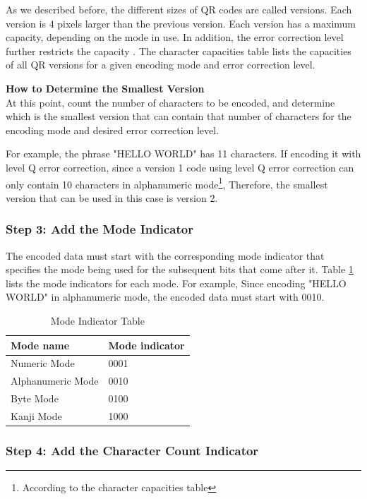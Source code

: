 As we described before, the different sizes of QR codes are called versions. Each version is 4 pixels larger than the previous version. Each version has a maximum capacity, depending on the mode in use. In addition, the error correction level further restricts the capacity . The character capacities table lists \cite{1iso} the capacities of all QR versions for a given encoding mode and error correction level.

\textbf{How to Determine the Smallest Version}\\
At this point, count the number of characters to be encoded, and determine which is the smallest version that can contain that number of characters for the encoding mode and desired error correction level.

For example, the phrase "HELLO WORLD" has 11 characters. If encoding it with level Q error correction, since a version 1 code using level Q error correction can only contain 10 characters in alphanumeric mode\footnote{According to the character capacities table}, Therefore, the smallest version that can be used in this case is version 2.

\subsubsection*{Step 3: Add the Mode Indicator}


The encoded data must start with the corresponding mode indicator that specifies the mode being used for the subsequent bits that come after it. Table \ref{table2.2} lists the mode indicators for each mode. For example, Since encoding "HELLO WORLD" in alphanumeric mode, the encoded data must start with 0010.

\begin{table}[h!]
  \centering
          \caption{Mode Indicator Table}
         \label{table2.2}
    \begin{tabular}{| l | l |}
    \hline
    Mode name & Mode indicator \\ \hline
    Numeric Mode & 0001  \\ \hline
    Alphanumeric Mode & 0010  \\ \hline
    Byte Mode & 0100  \\ \hline
    Kanji Mode & 1000  \\ \hline
    \end{tabular}

\end{table}

\subsubsection*{Step 4: Add the Character Count Indicator}

